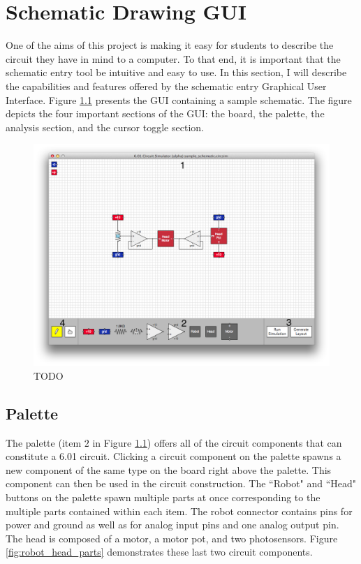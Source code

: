 
\chapter{Schematic Drawing GUI}
\label{app:gui}

One of the aims of this project is making it easy for students to describe the
circuit they have in mind to a computer. To that end, it is important that the
schematic entry tool be intuitive and easy to use. In this section, I will
describe the capabilities and features offered by the schematic entry Graphical
User Interface. Figure \ref{fig:gui} presents the GUI containing a sample
schematic. The figure depicts the four important sections of the GUI: the board,
the palette, the analysis section, and the cursor toggle section.

\begin{figure}
\begin{center}
\includegraphics[width=\textwidth]{Images/gui.png}
\caption{TODO}
\label{fig:gui}
\end{center}
\end{figure}

\section{Palette}

The palette (item $2$ in Figure \ref{fig:gui}) offers all of the circuit
components that can constitute a 6.01 circuit. Clicking a circuit component on
the palette spawns a new component of the same type on the board right above
the palette. This component can then be used in the circuit construction. The
``Robot" and ``Head" buttons on the palette spawn multiple parts at once
corresponding to the multiple parts contained within each item. The robot
connector contains pins for power and ground as well as for analog input pins
and one analog output pin. The head is composed of a motor, a motor pot, and
two photosensors. Figure \ref{fig:robot_head_parts} demonstrates these last two
circuit components.

